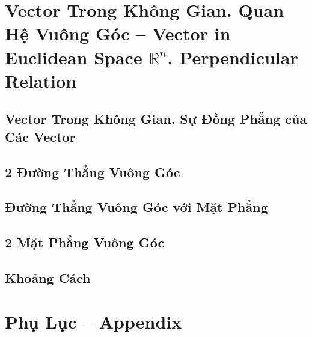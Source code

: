 \documentclass[oneside]{book}
\numberwithin{equation}{section}
\begin{document}

\chapter{Vector Trong Không Gian. Quan Hệ Vuông Góc -- Vector in Euclidean Space $\mathbb{R}^n$. Perpendicular Relation}

\section{Vector Trong Không Gian. Sự Đồng Phẳng của Các Vector}


\section{2 Đường Thẳng Vuông Góc}


\section{Đường Thẳng Vuông Góc với Mặt Phẳng}


\section{2 Mặt Phẳng Vuông Góc}


\section{Khoảng Cách}


\appendix

\chapter{Phụ Lục -- Appendix}
\end{document}
